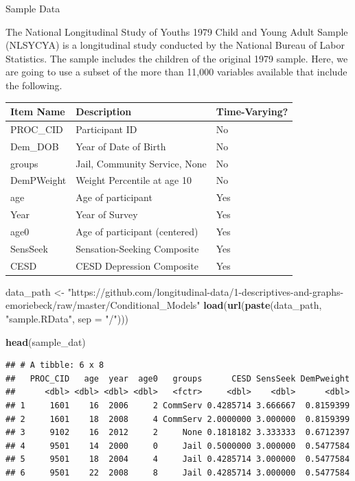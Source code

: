 \documentclass[ignorenonframetext,]{beamer}
\newenvironment{Shaded}{\begin{snugshade}}{\end{snugshade}}
\newcommand{\KeywordTok}[1]{\textcolor[rgb]{0.13,0.29,0.53}{\textbf{{#1}}}}
\newcommand{\DataTypeTok}[1]{\textcolor[rgb]{0.13,0.29,0.53}{{#1}}}
\newcommand{\StringTok}[1]{\textcolor[rgb]{0.31,0.60,0.02}{{#1}}}
\newcommand{\NormalTok}[1]{{#1}}
\begin{document}
\begin{frame}[fragile]{Sample Data}

The National Longitudinal Study of Youths 1979 Child and Young Adult
Sample (NLSYCYA) is a longitudinal study conducted by the National
Bureau of Labor Statistics. The sample includes the children of the
original 1979 sample. Here, we are going to use a subset of the more
than 11,000 variables available that include the following.

\begin{longtable}[]{@{}lll@{}}
\toprule
Item Name & Description & Time-Varying?\tabularnewline
\midrule
\endhead
PROC\_CID & Participant ID & No\tabularnewline
Dem\_DOB & Year of Date of Birth & No\tabularnewline
groups & Jail, Community Service, None & No\tabularnewline
DemPWeight & Weight Percentile at age 10 & No\tabularnewline
age & Age of participant & Yes\tabularnewline
Year & Year of Survey & Yes\tabularnewline
age0 & Age of participant (centered) & Yes\tabularnewline
SensSeek & Sensation-Seeking Composite & Yes\tabularnewline
CESD & CESD Depression Composite & Yes\tabularnewline
\bottomrule
\end{longtable}

\begin{Shaded}
\begin{Highlighting}[]
\NormalTok{data_path <-}\StringTok{ "https://github.com/longitudinal-data/1-descriptives-and-graphs-emoriebeck/raw/master/Conditional_Models"}
\KeywordTok{load}\NormalTok{(}\KeywordTok{url}\NormalTok{(}\KeywordTok{paste}\NormalTok{(data_path, }\StringTok{"sample.RData"}\NormalTok{, }\DataTypeTok{sep =} \StringTok{"/"}\NormalTok{)))}

\KeywordTok{head}\NormalTok{(sample_dat)}
\end{Highlighting}
\end{Shaded}

\begin{verbatim}
## # A tibble: 6 x 8
##   PROC_CID   age  year  age0   groups      CESD SensSeek DemPweight
##      <dbl> <dbl> <dbl> <dbl>   <fctr>     <dbl>    <dbl>      <dbl>
## 1     1601    16  2006     2 CommServ 0.4285714 3.666667  0.8159399
## 2     1601    18  2008     4 CommServ 2.0000000 3.000000  0.8159399
## 3     9102    16  2012     2     None 0.1818182 3.333333  0.6712397
## 4     9501    14  2000     0     Jail 0.5000000 3.000000  0.5477584
## 5     9501    18  2004     4     Jail 0.4285714 3.000000  0.5477584
## 6     9501    22  2008     8     Jail 0.4285714 3.000000  0.5477584
\end{verbatim}

\end{frame}
\end{document}
